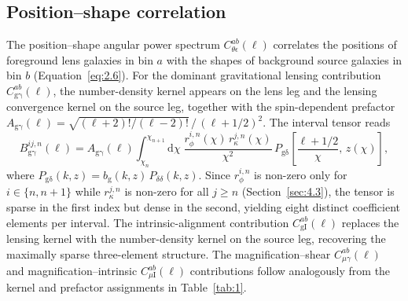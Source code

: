 \subsection{Position--shape correlation} \label{sec:5.2}

The position--shape angular power spectrum \(C_{\theta\epsilon}^{ab}(\ell)\) correlates the positions of foreground lens galaxies in bin \(a\) with the shapes of background source galaxies in bin \(b\) (Equation~\ref{eq:2.6}). For the dominant gravitational lensing contribution \(C_\mathrm{g\gamma}^{ab}(\ell)\), the number-density kernel appears on the lens leg and the lensing convergence kernel on the source leg, together with the spin-dependent prefactor \(A_\mathrm{g\gamma}(\ell) = \sqrt{(\ell+2)!/(\ell-2)!}\,/\,(\ell+1/2)^2\). The interval tensor reads
\begin{equation} \label{eq:5.8}
    B_\mathrm{g\gamma}^{ij,n}(\ell) = A_\mathrm{g\gamma}(\ell) \int_{\chi_n}^{\chi_{n+1}} \mathrm{d}\chi\; \frac{r_\phi^{i,n}(\chi)\,r_\kappa^{j,n}(\chi)}{\chi^2}\, P_\mathrm{g\delta}\!\left[\frac{\ell+1/2}{\chi},\, z(\chi)\right],
\end{equation}
where \(P_\mathrm{g\delta}(k,z) = b_\mathrm{g}(k,z)\,P_{\delta\delta}(k,z)\). Since \(r_\phi^{i,n}\) is non-zero only for \(i \in \{n, n{+}1\}\) while \(r_\kappa^{j,n}\) is non-zero for all \(j \ge n\) (Section~\ref{sec:4.3}), the tensor is sparse in the first index but dense in the second, yielding eight distinct coefficient elements per interval. The intrinsic-alignment contribution \(C_\mathrm{gI}^{ab}(\ell)\) replaces the lensing kernel with the number-density kernel on the source leg, recovering the maximally sparse three-element structure. The magnification--shear \(C_{\mu\gamma}^{ab}(\ell)\) and magnification--intrinsic \(C_{\mu\mathrm{I}}^{ab}(\ell)\) contributions follow analogously from the kernel and prefactor assignments in Table~\ref{tab:1}.

